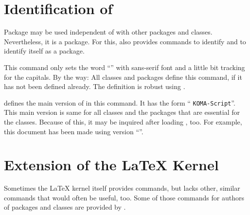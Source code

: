 \section{Identification of \KOMAScript}
\label{sec:scrbase.identify}

Package  may be used independent of \KOMAScript{} with
other packages and classes. Nevertheless, it is a \KOMAScript{} package. For
this,  also provides commands to identify \KOMAScript{} and
to identify itself as a \KOMAScript{} package.

\begin{Declaration}
\end{Declaration}
%
This command only sets the word ``\KOMAScript'' with sans-serif font and
a little bit tracking for the capitals. By the way: All \KOMAScript{} classes
and packages define this command, if it has not been defined already. The
definition is robust using .
%


\begin{Declaration}
\end{Declaration}
%
\KOMAScript{} defines the main version of \KOMAScript{} in this command. It
has the form ``  \texttt{KOMA-Script}''. This main
version is same for all \KOMAScript{} classes and the \KOMAScript{} packages
that are essential for the classes. Because of this, it may be inquired after
loading , too. For example, this document has been made using
\KOMAScript{} version ``\KOMAScriptVersion''.
%
%


\section{Extension of the \LaTeX{} Kernel}
\label{sec:scrbase:latexkernel}

Sometimes the \LaTeX{} kernel itself provides commands, but lacks other,
similar commands that would often be useful, too. Some of those commands for
authors of packages and classes are provided by .

